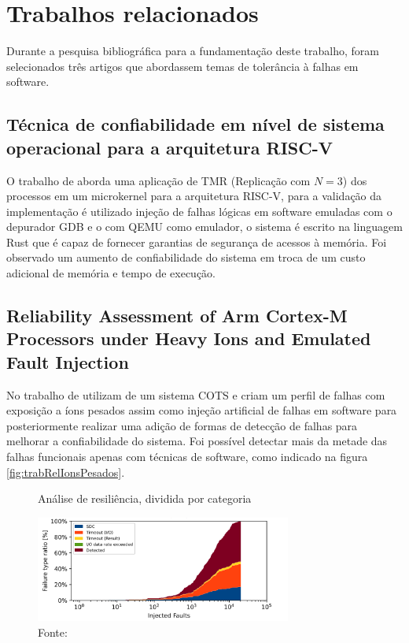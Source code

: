 \section{Trabalhos relacionados} \label{sec:trabRel}

Durante a pesquisa bibliográfica para a fundamentação deste trabalho, foram selecionados três artigos que abordassem temas de tolerância à falhas em software.

\subsection{Técnica de confiabilidade em nível de sistema operacional para a arquitetura RISC-V}

O trabalho de  aborda uma aplicação de TMR (Replicação com $N = 3$) dos processos em um microkernel para a arquitetura RISC-V, para a validação da implementação é utilizado injeção de falhas lógicas em software emuladas com o depurador GDB e o com QEMU como emulador, o sistema é escrito na linguagem Rust que é capaz de fornecer garantias de segurança de acessos à memória. Foi observado um aumento de confiabilidade do sistema em troca de um custo adicional de memória e tempo de execução.

\subsection{Reliability Assessment of Arm Cortex-M Processors under Heavy Ions and Emulated Fault Injection}

No trabalho de  utilizam de um sistema COTS e criam um perfil de falhas com exposição a íons pesados assim como injeção artificial de falhas em software para posteriormente realizar uma adição de formas de detecção de falhas para melhorar a confiabilidade do sistema. Foi possível detectar mais da metade das falhas funcionais apenas com técnicas de software, como indicado na figura \autoref{fig:trabRelIonsPesados}.

\begin{figure}[H]
    \centering
    \captionsetup{justification=centering}
    \caption{Análise de resiliência, dividida por categoria}
    \includegraphics[width=0.75\textwidth]{assets/related_works_heavy_ion_reliability.png}
    \captionsetup{justification=raggedright}
    \caption*{Fonte: }
    \label{fig:trabRelIonsPesados}
\end{figure}

